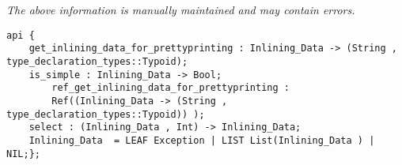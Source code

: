 \label{pkg:inlining\_data}

{\tiny \it The above information is manually maintained and may contain errors.}
\begin{verbatim}
api {
    get_inlining_data_for_prettyprinting : Inlining_Data -> (String , type_declaration_types::Typoid);
    is_simple : Inlining_Data -> Bool;
        ref_get_inlining_data_for_prettyprinting :
        Ref((Inlining_Data -> (String , type_declaration_types::Typoid)) );
    select : (Inlining_Data , Int) -> Inlining_Data;
    Inlining_Data  = LEAF Exception | LIST List(Inlining_Data ) | NIL;};
\end{verbatim}
